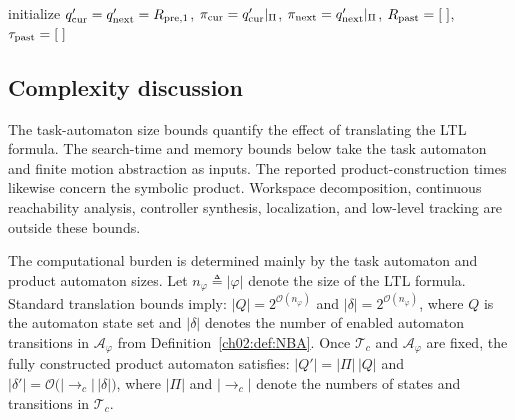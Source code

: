 \begin{algorithm}[t]
\caption{Plan execution by hybrid control, \texttt{HybCon}().}
\label{ch02:alg:hybrid}
\DontPrintSemicolon
{}
initialize
$q_{\textup{cur}}' = q_{\textup{next}}' = R_{\textup{pre},1}$,
$\pi_{\textup{cur}} = q_{\textup{cur}}'|_{\Pi}$,
$\pi_{\textup{next}} = q_{\textup{next}}'|_{\Pi}$,
$R_{\textup{past}} = [\;]$,
$\tau_{\textup{past}} = [\;]$\;
\;
\end{algorithm}


\subsection{Complexity discussion}
\label{ch02:sssec:complexity_on_the_fly}

\begin{revision}
The task-automaton size bounds quantify the effect of translating the LTL
formula. The search-time and memory bounds below take the task automaton
and finite motion abstraction as inputs. The reported product-construction
times likewise concern the symbolic product. Workspace decomposition,
continuous reachability analysis, controller synthesis, localization, and
low-level tracking are outside these bounds.
\end{revision}

The computational burden is determined mainly by the task automaton and product
automaton sizes. Let $n_{\varphi} \triangleq |\varphi|$ denote the size of the
LTL formula. Standard translation bounds imply:
$|Q| = 2^{\mathcal{O}(n_{\varphi})}$ and $|\delta| = 2^{\mathcal{O}(n_{\varphi})}$,
where $Q$ is the automaton state set and $|\delta|$ denotes the number of
enabled automaton transitions in $\mathcal{A}_{\varphi}$ from
Definition~\ref{ch02:def:NBA}.
Once $\mathcal{T}_c$ and $\mathcal{A}_{\varphi}$ are fixed, the fully
constructed product automaton satisfies:
$|Q'| = |\Pi|\,|Q|$ and $|\delta'| = \mathcal{O}\bigl(|\longrightarrow_c|\,|\delta|\bigr)$,
where $|\Pi|$ and $|\longrightarrow_c|$ denote the numbers of states and
transitions in $\mathcal{T}_c$.

